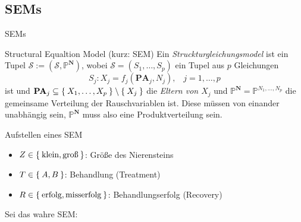 \subsection{SEMs}
\begin{frame}{SEMs}
    \begin{block}{Structural Equaltion Model (kurz: SEM)}
        Ein \textit{Struckturgleichungsmodel} ist ein Tupel
        $\mathcal{S} := (\mathcal{S}, \mathbb{P}^\mathbf{N})$, wobei
        $\mathcal{S} = (S_1, \dots, S_p)$ ein Tupel aus $p$ Gleichungen
        \[S_j : X_j = f_j(\mathbf{PA}_j, N_j), \;\;\; j=1, \dots, p\]
        ist und $\mathbf{PA}_j \subseteq \Set{X_1, \dots, X_p} \setminus \Set{X_j}$
        die \textit{Eltern von $X_j$} und $\mathbb{P}^\mathbf{N} = \mathbb{P}^{N_1, \dots, N_p}$
        die gemeinsame Verteilung der Rauschvariablen ist. Diese müssen
        von einander unabhängig sein, $\mathbb{P}^\mathbf{N}$ muss also eine
        Produktverteilung sein.
    \end{block}
\end{frame}

\begin{frame}{Aufstellen eines SEM}
    \begin{itemize}[label={}]
        \item $Z \in \Set{\text{klein}, \text{groß}}$: Größe des Nierensteins
        \item $T \in \Set{A, B}$: Behandlung (Treatment)
        \item $R \in \Set{\text{erfolg}, \text{misserfolg}}$: Behandlungserfolg (Recovery)
    \end{itemize}

    Sei das wahre SEM:
    \begin{figure}[!h]
        \centering
    \end{figure}
\end{frame}